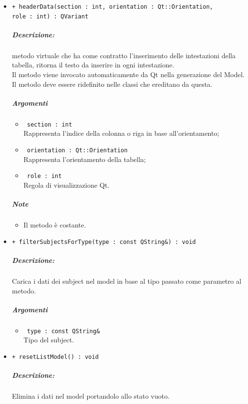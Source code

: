 {\begin{itemize}
	\item \color{blue}\verb!+ headerData(section : int, orientation : Qt::Orientation,!\\
	  \verb!role : int) : QVariant!\\
	\color{black}
	\subparagraph{Descrizione:} metodo virtuale che ha come contratto l'inserimento delle intestazioni della tabella, ritorna il testo da inserire in ogni intestazione.\\
	Il metodo viene invocato automaticamente da Qt\g{} nella generazione del Model.\\
	Il metodo deve essere ridefinito nelle classi che ereditano da questa.\\
	\subparagraph{Argomenti}
		\begin{itemize}
			\item \color{RoyalPurple}\verb! section : int!\\
			\color{black}Rappresenta l'indice della colonna o riga in base all'orientamento;
			
			\item \color{RoyalPurple}\verb! orientation : Qt::Orientation!\\
			\color{black}Rappresenta l'orientamento della tabella;
			
			\item \color{RoyalPurple}\verb! role : int!\\
			\color{black}Regola di visualizzazione Qt\g{}.
		\end{itemize}
	\subparagraph{Note}
			\begin{itemize}
				\item Il metodo è costante.
			\end{itemize}
		
	\item \color{blue}\verb!+ filterSubjectsForType(type : const QString&) : void!\\
		\color{black}
		\subparagraph{Descrizione:} Carica i dati dei subject\g{} nel model in base al tipo passato come parametro al metodo.\\
		\subparagraph{Argomenti}
			\begin{itemize}				
				\item \color{RoyalPurple}\verb! type : const QString&!\\
				\color{black} Tipo del subject\g{}.
			\end{itemize}
			
	\item \color{blue}\verb!+ resetListModel() : void!\\
		\color{black}
		\subparagraph{Descrizione:} Elimina i dati nel model portandolo allo stato vuoto.\\
			

\end{itemize}}
